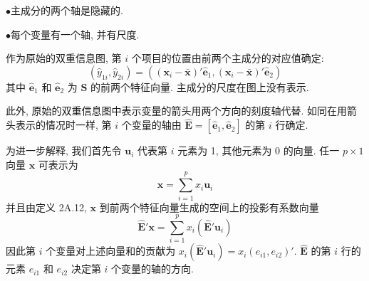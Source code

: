 
\begin{mvfigure}
\label{fig:12.24}
\end{mvfigure}

\noindent$\bullet$\quad 主成分的两个轴是隐藏的.

\noindent$\bullet$\quad 每个变量有一个轴, 并有尺度.

作为原始的双重信息图, 第 $i$ 个项目的位置由前两个主成分的对应值确定:
\[
(\hat{y}_{1i},\hat{y}_{2i})=\left((\mathbf{x}_i-\bar{\mathbf{x}})'\hat{\mathbf{e}}_1,
(\mathbf{x}_i-\bar{\mathbf{x}})'\hat{\mathbf{e}}_2\right)
\]
其中 $\hat{\mathbf{e}}_1$ 和 $\hat{\mathbf{e}}_2$ 为 $\mathbf{S}$ 的前两个特征向量. 主成分的尺度在图上没有表示.

此外, 原始的双重信息图中表示变量的箭头用两个方向的刻度轴代替. 如同在用箭头表示的情况时一样, 第 $i$ 个变量的轴由 $\hat{\mathbf{E}}=[\hat{\mathbf{e}}_1,\hat{\mathbf{e}}_2]$ 的第 $i$ 行确定.

为进一步解释, 我们首先令 $\mathbf{u}_i$ 代表第 $i$ 元素为 1, 其他元素为 0 的向量. 任一 $p\times 1$ 向量 $\mathbf{x}$ 可表示为
\[
\mathbf{x}=\sum_{i=1}^{p}x_i\mathbf{u}_i
\]
并且由定义 2A.12, $\mathbf{x}$ 到前两个特征向量生成的空间上的投影有系数向量
\[
\hat{\mathbf{E}}'\mathbf{x}=\sum_{i=1}^{p}x_i(\hat{\mathbf{E}}'\mathbf{u}_i)
\]
因此第 $i$ 个变量对上述向量和的贡献为 $x_i(\hat{\mathbf{E}}'\mathbf{u}_i)=x_i(e_{i1},e_{i2})'$. $\hat{\mathbf{E}}$ 的第 $i$ 行的元素 $e_{i1}$ 和 $e_{i2}$ 决定第 $i$ 个变量的轴的方向.
